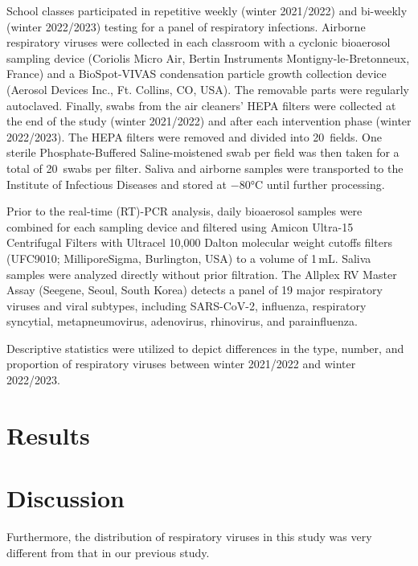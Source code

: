 \documentclass[fleqn,11pt]{wlscirep}
\begin{document}
School classes participated in repetitive weekly (winter 2021/2022) and bi-weekly (winter 2022/2023) testing for a panel of respiratory infections. Airborne respiratory viruses were collected in each classroom with a cyclonic bioaerosol sampling device (Coriolis Micro Air, Bertin Instruments Montigny-le-Bretonneux, France) and a BioSpot-VIVAS condensation particle growth collection device (Aerosol Devices Inc., Ft. Collins, CO, USA)\cite{Lednicky2016AST}. The removable parts were regularly autoclaved. Finally, swabs from the air cleaners' HEPA filters were collected at the end of the study (winter 2021/2022) and after each intervention phase (winter 2022/2023). The HEPA filters were removed and divided into 20~fields. One sterile Phosphate-Buffered Saline-moistened swab per field was then taken for a total of 20~swabs per filter. Saliva and airborne samples were transported to the Institute of Infectious Diseases and stored at $-$80°C until further processing\cite{Huber2021}. 

Prior to the real-time (RT)-PCR analysis, daily bioaerosol samples were combined for each sampling device and filtered using Amicon Ultra-15 Centrifugal Filters with Ultracel 10,000 Dalton molecular weight cutoffs filters (UFC9010; MilliporeSigma, Burlington, USA) to a volume of 1\,mL. Saliva samples were analyzed directly without prior filtration. The Allplex RV Master Assay (Seegene, Seoul, South Korea) detects a panel of 19 major respiratory viruses and viral subtypes, including SARS-CoV-2, influenza, respiratory syncytial, metapneumovirus, adenovirus, rhinovirus, and parainfluenza. 

Descriptive statistics were utilized to depict differences in the type, number, and proportion of respiratory viruses between winter 2021/2022 and winter 2022/2023.

\section*{Results}

\section*{Discussion}

Furthermore, the distribution of respiratory viruses in this study was very different from that in our previous study. 

\end{document}
